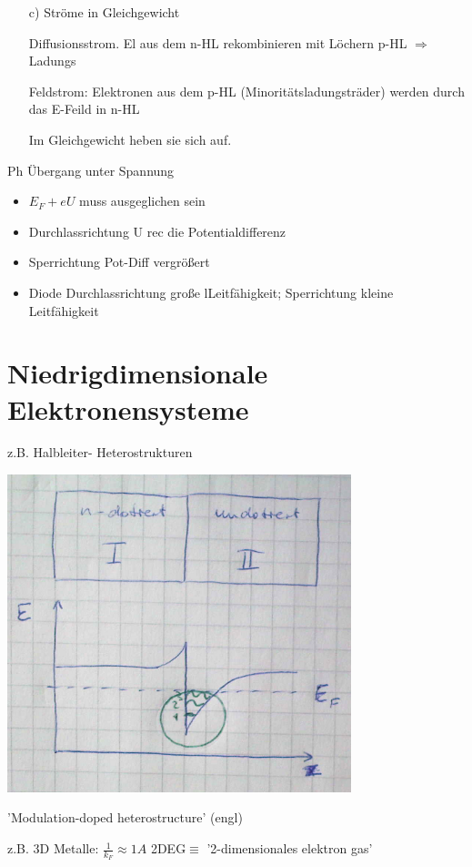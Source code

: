 \begin{enumerate}
\begin{enumerate}
  \item[c)] Ströme in Gleichgewicht

Diffusionsstrom. El aus dem n-HL rekombinieren mit Löchern p-HL \(\Rightarrow \) Ladungs

Feldstrom: Elektronen aus dem p-HL (Minoritätsladungsträder) werden durch das E-Feild in n-HL

Im Gleichgewicht heben sie sich auf. 
  \end{enumerate}

Ph Übergang unter Spannung
\begin{itemize}
\item \(E_F+eU\) muss ausgeglichen sein
\item Durchlassrichtung U rec  die Potentialdifferenz
\item Sperrichtung Pot-Diff vergrößert
\item Diode Durchlassrichtung große lLeitfähigkeit; Sperrichtung kleine Leitfähigkeit
\end{itemize}


\end{enumerate}



\section{Niedrigdimensionale Elektronensysteme}


z.B. Halbleiter- Heterostrukturen

\includegraphics[width=0.75\textwidth]{kap11_01.png}

'Modulation-doped heterostructure' (engl)

z.B. 3D Metalle: \(\frac{1}{k_F}\approx 1 A\)
2DEG\(\equiv\) '2-dimensionales elektron gas'

